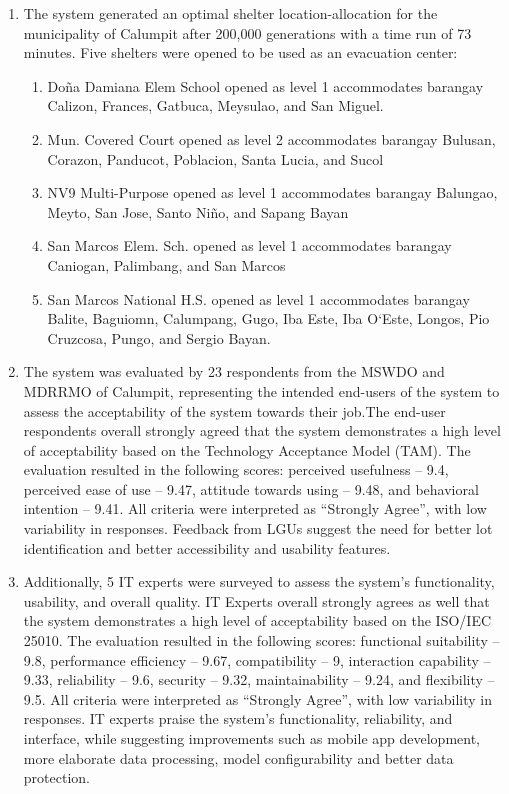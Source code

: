 \begin{enumerate}
	 \item The system generated an optimal shelter location-allocation for the municipality of Calumpit after 200,000 generations with a time run of 73 minutes. Five shelters were opened to be used as an evacuation center: 
	\begin{enumerate}[label*=\arabic*]
		\item Doña Damiana Elem School opened as level 1 accommodates barangay Calizon, Frances, Gatbuca, Meysulao, and San Miguel.
		\item Mun. Covered Court opened as level 2 accommodates barangay Bulusan, Corazon, Panducot, Poblacion, Santa Lucia, and Sucol
		\item NV9 Multi-Purpose opened as level 1 accommodates barangay Balungao, Meyto, San Jose, Santo Niño, and Sapang Bayan
		\item San Marcos Elem. Sch. opened as level 1 accommodates barangay Caniogan, Palimbang, and San Marcos
		\item San Marcos National H.S. opened as level 1 accommodates barangay Balite, Baguiomn, Calumpang, Gugo, Iba Este, Iba O`Este, Longos, Pio Cruzcosa, Pungo, and Sergio Bayan.
	\end{enumerate}
	
	\item The system was evaluated by 23 respondents from the MSWDO and MDRRMO of Calumpit, representing the intended end-users of the system to assess the acceptability of the system towards their job.The end-user respondents overall strongly agreed that the system demonstrates a high level of acceptability based on the Technology Acceptance Model (TAM). The evaluation resulted in the following scores: perceived usefulness – 9.4, perceived ease of use – 9.47, attitude towards using – 9.48, and behavioral intention – 9.41. All criteria were interpreted as “Strongly Agree”, with low variability in responses. Feedback from LGUs suggest the need for better lot identification and better accessibility and usability features.
	
	\item Additionally, 5 IT experts were surveyed to assess the system’s functionality, usability, and overall quality. IT Experts overall strongly agrees as well that the system demonstrates a high level of acceptability based on the ISO/IEC 25010. The evaluation resulted in the following scores: functional suitability – 9.8, performance efficiency – 9.67, compatibility – 9, interaction capability – 9.33, reliability – 9.6, security – 9.32, maintainability – 9.24, and flexibility – 9.5. All criteria were interpreted as “Strongly Agree”, with low variability in responses. IT experts praise the system's functionality, reliability, and interface, while suggesting improvements such as mobile app development, more elaborate data processing, model configurability and better data protection.
		
	\end{enumerate}

